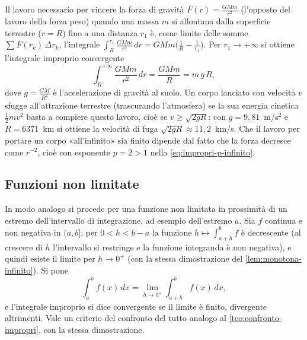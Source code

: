 \begin{esempio}\label{es:velocita-fuga}
Il lavoro necessario per vincere la forza di gravità $F(r)=\frac{GMm}{r^{2}}$ (l'opposto del
lavoro della forza peso) quando una massa $m$ si allontana dalla superficie terrestre
($r=R$) fino a una distanza $r_{1}$ è, come limite delle somme
$\sum F(r_{k})\,\Delta r_{k}$, l'integrale $\int_{R}^{r_{1}}\frac{GMm}{r^{2}}\,dr=GMm\bigl(\frac1R-\frac1{r_{1}}\bigr)$. Per
$r_{1}\to+\infty$ si ottiene l'integrale improprio convergente
\[
  \int_{R}^{+\infty}\frac{GMm}{r^{2}}\,dr=\frac{GMm}R=m\,g\,R ,
\]
dove $g=\frac{GM}{R^{2}}$ è l'accelerazione di gravità al suolo. Un corpo lanciato con velocità
$v$ sfugge all'attrazione terrestre (trascurando l'atmosfera) se la sua energia cinetica
$\frac12mv^{2}$ basta a compiere questo lavoro, cioè se $v\ge\sqrt{2gR}$: con $g=9{,}81$~m/s$^{2}$ e
$R=6371$~km si ottiene la velocità di fuga $\sqrt{2gR}\approx11{,}2$~km/s. Che il lavoro
per portare un corpo «all'infinito» sia finito dipende dal fatto che la forza decresce
come $r^{-2}$, cioè con esponente $p=2>1$ nella \eqref{eq:impropri-p-infinito}.
\end{esempio}

\subsection{Funzioni non limitate}

In modo analogo si procede per una funzione non limitata in prossimità di un estremo
dell'intervallo di integrazione, ad esempio dell'estremo $a$. Sia $f$ continua e non
negativa in $(a,b]$; per $0<h<b-a$ la funzione $h\mapsto\int_{a+h}^{b}f$ è decrescente (al crescere
di $h$ l'intervallo si restringe e la funzione integranda è non negativa), e quindi
esiste il limite per $h\to0^{+}$ (con la stessa dimostrazione del
\cref{lem:monotona-infinito}). Si pone
\begin{equation}\label{eq:improprio-non-limitata}
  \int_{a}^{b}f(x)\,dx=\lim_{h\to0^{+}}\int_{a+h}^{b}f(x)\,dx ,
\end{equation}
e l'integrale improprio si dice convergente se il limite è finito, divergente
altrimenti. Vale un criterio del confronto del tutto analogo al
\cref{teo:confronto-impropri}, con la stessa dimostrazione.

